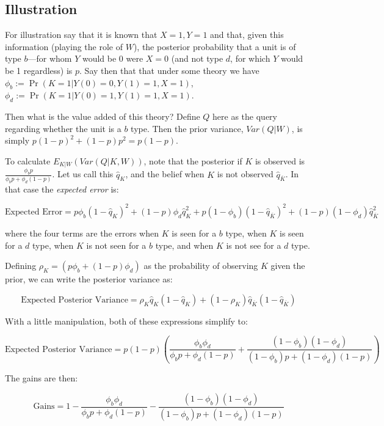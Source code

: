 \documentclass[
  12pt,
]{book}
\begin{document}
\hypertarget{illustration-1}{%
\subsection{Illustration}\label{illustration-1}}

For illustration say that it is known that \(X=1, Y=1\) and that, given this information (playing the role of \(W\)), the posterior probability that a unit is of type \(b\)---for whom \(Y\) would be 0 were \(X=0\) (and not type \(d\), for which \(Y\) would be 1 regardless) is \(p\). Say then that that under some theory we have \(\phi_b := \Pr(K=1 | Y(0)=0, Y(1)=1, X=1)\), \(\phi_d := \Pr(K=1 | Y(0)=1, Y(1)=1, X=1)\).

Then what is the value added of this theory? Define \(Q\) here as the query regarding whether the unit is a \(b\) type. Then the prior variance, \(Var(Q|W)\), is simply \(p(1-p)^2 +(1-p)p^2 = p(1-p)\).

To calculate \(E_{K|W}(Var(Q|K,W))\), note that the posterior if \(K\) is observed is \(\frac{\phi_bp}{\phi_bp+\phi_d(1-p)}\). Let us call this \(\hat{q}_K\), and the belief when \(K\) is not observed \(\hat{q}_{\overline{K}}\).
In that case the \emph{expected error} is:

\[\text{Expected Error} = p\phi_b\left(1-\hat{q}_K\right)^2+(1-p)\phi_d\hat{q}_K^2+p(1-\phi_b)\left(1-\hat{q}_{\overline{K}}\right)^2+(1-p)(1-\phi_d)\hat{q}_{\overline{K}}^2\]

where the four terms are the errors when \(K\) is seen for a \(b\) type, when \(K\) is seen for a \(d\) type, when \(K\) is not seen for a \(b\) type, and when \(K\) is not see for a \(d\) type.

Defining \(\rho_K = (p\phi_b+(1-p)\phi_d)\) as the probability of observing \(K\) given the prior, we can write the posterior variance as:

\[\text{Expected Posterior Variance} = \rho_K\hat{q}_K(1-\hat{q}_K)+(1-\rho_K)\hat{q}_{\overline{K}}(1-\hat{q}_{\overline{K}})\]

With a little manipulation, both of these expressions simplify to:

\[\text{Expected Posterior Variance} =p(1-p)\left(\frac{\phi_b\phi_d}{\phi_bp+\phi_d(1-p)} + \frac{(1-\phi_b)(1-\phi_d)}{(1-\phi_b)p+(1-\phi_d)(1-p)}\right)\]

The gains are then:

\[\text{Gains} =1- \frac{\phi_b\phi_d}{\phi_bp+\phi_d(1-p)} - \frac{(1-\phi_b)(1-\phi_d)}{(1-\phi_b)p+(1-\phi_d)(1-p)}\]
\end{document}

